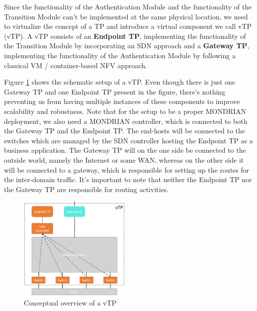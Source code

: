 Since the functionality of the Authentication Module and the functionality of the Transition Module can't be implemented at the same physical location, we need to virtualize the concept of a \acs{TP} and introduce a virtual component we call \acs{vTP} (\acl{vTP}). A \acs{vTP} consists of an \textbf{Endpoint \acs{TP}}, implementing the functionality of the Transition Module by incorporating an \acs{SDN} approach and a \textbf{Gateway \acs{TP}}, implementing the functionality of the Authentication Module by following a classical \acs{VM} / container-based \acs{NFV} approach. 

Figure \ref{vTP Overview} shows the schematic setup of a \acs{vTP}. Even though there is just one Gateway \acs{TP} and one Endpoint \acs{TP} present in the figure, there's nothing preventing us from having multiple instances of these components to improve scalability and robustness. Note that for the setup to be a proper MONDRIAN deployment, we also need a MONDRIAN controller, which is connected to both the Gateway \acs{TP} and the Endpoint \acs{TP}. The end-hosts will be connected to the switches which are managed by the \acs{SDN} controller hosting the Endpoint \acs{TP} as a business application. The Gateway \acs{TP} will on the one side be connected to the outside world, namely the Internet or some \acs{WAN}, whereas on the other side it will be connected to a gateway, which is responsible for setting up the routes for the inter-domain traffic. It's important to note that neither the Endpoint \acs{TP} nor the Gateway \acs{TP} are responsible for routing activities.


\begin{figure}[t]
	\centering
	\includegraphics[width =0.48\textwidth]{img/vTP2.png}
	\caption{Conceptual overview of a \acl{vTP}}
	\label{vTP Overview}
\end{figure}

